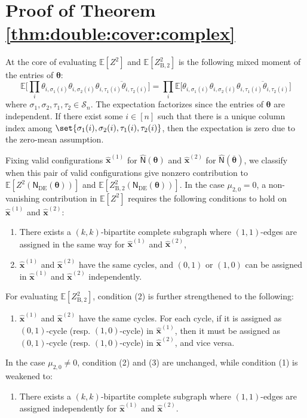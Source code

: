 \documentclass[conference]{IEEEtran}
\theoremstyle{plain}
\theoremstyle{definition}
\newcommand{\B}{\mathrm{B}}
\newcommand{\E}{\mathbb {E}}
\newcommand{\sfn}{\mathsf{N}}
\newcommand{\hatbfx}[1][]{\widehat{\mathbf{x}}^{ #1 }}
\newcommand{\btheta}{\boldsymbol{\theta}}
\newcommand{\sfnDE}{\sfn_{\mathrm{DE}}}
\begin{document}

 \section{Proof of Theorem \ref{thm:double:cover:complex}}\label{appx:double:cover:complex}
 At the core of evaluating \(\E[Z^2]\) and \(\E[Z^2_{\B,2}]\)
 is the following mixed moment of the entries of \(\boldsymbol{\theta}\):
 \[
  \E\Big[\prod_i\theta_{i,\sigma_1(i)}\theta_{i,\sigma_2(i)}\overline{\theta_{i,\tau_1(i)}\theta_{i,\tau_2(i)}}\Big]
  =\prod_i \E\Big[\theta_{i,\sigma_1(i)}\theta_{i,\sigma_2(i)}\overline{\theta_{i,\tau_1(i)}\theta_{i,\tau_2(i)}}\Big]
 \]
 where \(\sigma_1,\sigma_2,\tau_1,\tau_2\in\mathcal{S}_n\). The expectation
 factorizes since the entries of \(\boldsymbol{\theta}\) are independent. If
 there exist some \(i\in[n]\) such that there is a unique column index among
 \(\set{\sigma_1(i),\sigma_2(i),\tau_1(i),\tau_2(i)}\), then the expectation is
 zero due to the zero-mean assumption.

 Fixing valid configurations $\hatbfx[(1)]$ for $\widehat{\sfn}(\btheta)$ and $\hatbfx[(2)]$ 
 for $\widehat{\sfn}(\overline{\btheta})$, we classify when this pair of valid configurations give nonzero
 contribution to \(\E[Z^2(\sfnDE(\btheta))]\) and \(\E[Z^2_{\B,2}(\sfnDE(\btheta))]\).
 In the case $\mu_{2,0}=0$, a non-vanishing contribution in \(\E[Z^2]\)
 requires the following conditions to hold on \(\hatbfx[(1)]\) and
 \(\hatbfx[(2)]\):
 \begin{enumerate}[label=(\arabic*)]
  \item There exists a \((k,k)\)-bipartite complete subgraph where
  \((1,1)\)-edges are assigned in the same way for \(\hatbfx[(1)]\)
  and \(\hatbfx[(2)]\),
  \item \(\hatbfx[(1)]\) and \(\hatbfx[(2)]\) have the same cycles,
  and \((0,1)\) or \((1,0)\) can be assigned in \(\hatbfx[(1)]\) and \(\hatbfx[(2)]\) independently.
 \end{enumerate}
 For evaluating \(\E[Z^2_{\B,2}]\), condition (2) is further strengthened to the following:
 \begin{enumerate}[label=(\arabic*), start=3]
  \item \(\hatbfx[(1)]\) and \(\hatbfx[(2)]\) have the same cycles.
  For each cycle, if it is assigned as \((0,1)\)-cycle (resp. \((1,0)\)-cycle) in \(\hatbfx[(1)]\),
  then it must be assigned as \((0,1)\)-cycle (resp. \((1,0)\)-cycle) in \(\hatbfx[(2)]\), and vice versa.
 \end{enumerate}
 In the case \(\mu_{2,0}\neq 0\), condition (2) and (3) are unchanged, while condition (1) is weakened to:
 \begin{enumerate}[label=(\arabic*), start=4]
  \item There exists a \((k,k)\)-bipartite complete subgraph where
  \((1,1)\)-edges are assigned independently for \(\hatbfx[(1)]\)
  and \(\hatbfx[(2)]\).
 \end{enumerate}
\end{document}
